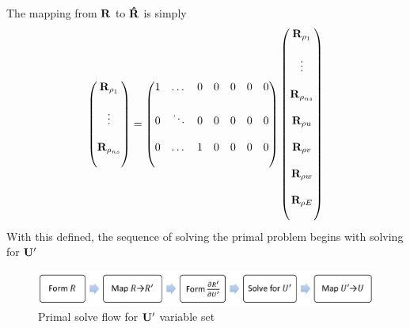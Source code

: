 \documentclass{article}   	%
\begin{document}
The mapping from $\mathbf R$ to $\mathbf{\hat{R}}$ is simply
\begin{equation}
  \begin{pmatrix}
    \mathbf R_{\rho_1}     \\ \\
    \vdots           \\ \\
    \mathbf R_{\rho_{ns}}  \\ \\
  \end{pmatrix} =
  \begin{pmatrix}
    1  &  \dots  &  0  &  0  &  0  &  0  &  0  \\ \\
    0  &  \ddots &  0  &  0  &  0  &  0  &  0  \\ \\
    0  &  \dots  &  1  &  0  &  0  &  0  &  0  \\ \\
  \end{pmatrix}
  \begin{pmatrix}
    \mathbf R_{\rho_1}    \\ \\
         \vdots     \\ \\
    \mathbf R_{\rho_{ns}} \\ \\
    \mathbf R_{\rho u}    \\ \\
		\mathbf R_{\rho v}    \\ \\
		\mathbf R_{\rho w}    \\ \\
		\mathbf R_{\rho E}    \\ \\
  \end{pmatrix}
  \label{R-map2}
\end{equation}
With this defined, the sequence of solving the primal problem begins with
solving for $\mathbf{U}'$
\begin{figure}[h]
  \centering
  \includegraphics[width=\textwidth]{mean_solve_flow.png}
  \caption{Primal solve flow for $\mathbf{U}'$ variable set}
  \label{fig:mean-solve-flow}
\end{figure}
\end{document}

